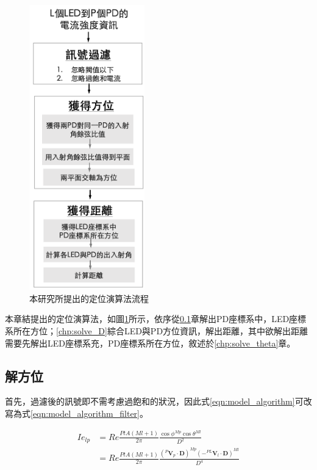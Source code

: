 \begin{figure}[h]
    \centering
    \includegraphics[width=5cm]{ch3pic/algorithm_flow.png}
    \caption{本研究所提出的定位演算法流程}
    \label{pic:algorithm_flow}
\end{figure}

本章結提出的定位演算法，如圖\ref{pic:algorithm_flow}所示，依序從\ref{chp:solve_phi}章解出PD座標系中，LED座標系所在方位；\ref{chp:solve_D}綜合LED與PD方位資訊，解出距離，其中欲解出距離需要先解出LED座標系充，PD座標系所在方位，敘述於\ref{chp:solve_theta}章。


    \subsection{解方位}
    \label{chp:solve_phi}

    首先，過濾後的訊號即不需考慮過飽和的狀況，因此式\ref{eqn:model_algorithm}可改寫為式\ref{eqn:model_algorithm_filter}。

    \begin{equation}
        \label{eqn:model_algorithm_filter}
        \begin{aligned}
            Ie_{lp} &= Re\frac{PtA(Ml+1)}{2\pi}\frac{{\cos\phi}^{Mp}{\cos\theta}^{Ml}}{D^2}\\
            & = Re\frac{PtA(Ml+1)}{2\pi}\frac{{(^{P}\boldsymbol{V}_p\cdot\boldsymbol{D})}^{Mp}{(-^{PL}\boldsymbol{V}_l\cdot\boldsymbol{D})}^{Ml}}{D^4}
        \end{aligned}
    \end{equation}

